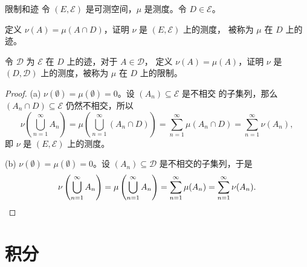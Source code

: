 \documentclass[fontset=none]{Notes}
\begin{document}
\begin{exercise}{限制和迹}{}
  令 $(E,\mathcal{E})$ 是可测空间，$\mu$ 是测度。令 $D\in \mathcal{E}$。
  \begin{alphenum}[nosep]
    \item 定义 $\nu(A)=\mu(A\cap D)$，证明 $\nu$ 是 $(E,\mathcal{E})$ 上的测度，
    被称为 $\mu$ 在 $D$ 上的迹。
    \item 令 $\mathcal{D}$ 为 $\mathcal{E}$ 在 $D$ 上的迹，对于 $A\in \mathcal{D}$，
    定义 $\nu(A)=\mu(A)$，证明 $\nu$ 是 $(D,\mathcal{D})$ 上的测度，被称为
    $\mu$ 在 $D$ 上的限制。
  \end{alphenum}
\end{exercise}
\begin{proof}
  (a) $\nu(\emptyset)=\mu(\emptyset)=0$。设 $(A_n)\subseteq \mathcal{E}$ 是不相交
  的子集列，那么 $(A_n\cap D)\subseteq \mathcal{E}$ 仍然不相交，所以
  \[
    \nu\left(\bigcup_{n=1}^\infty A_n\right)=\mu\left(\bigcup_{n=1}^\infty (A_n\cap D)\right)
    =\sum_{n=1}^\infty \mu(A_n\cap D)=\sum_{n=1}^\infty \nu(A_n),
  \]
  即 $\nu$ 是 $(E,\mathcal{E})$ 上的测度。

  (b) $\nu(\emptyset)=\mu(\emptyset)=0$。设 $(A_n)\subseteq \mathcal{D}$
  是不相交的子集列，于是
  \[
    \nu\left(\bigcup_{n=1}^\infty A_n\right)=\mu\left(\bigcup_{n=1}^\infty A_n\right)
    =\sum_{n=1}^\infty\mu(A_n)=\sum_{n=1}^\infty\nu(A_n).\qedhere
  \]
\end{proof}

\section{积分}
\end{document}

